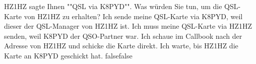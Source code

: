     {HZ1HZ sagte Ihnen ""QSL via K8PYD"". Was würden Sie tun, um die QSL-Karte von HZ1HZ zu erhalten?}
    {Ich sende meine QSL-Karte via K8PYD, weil dieser der QSL-Manager von HZ1HZ ist.}
    {Ich muss meine QSL-Karte via HZ1HZ senden, weil K8PYD der QSO-Partner war.}
    {Ich schaue im Callbook nach der Adresse von HZ1HZ und schicke die Karte direkt.}
    {Ich warte, bis HZ1HZ die Karte an K8PYD geschickt hat.}
    {false}{false}